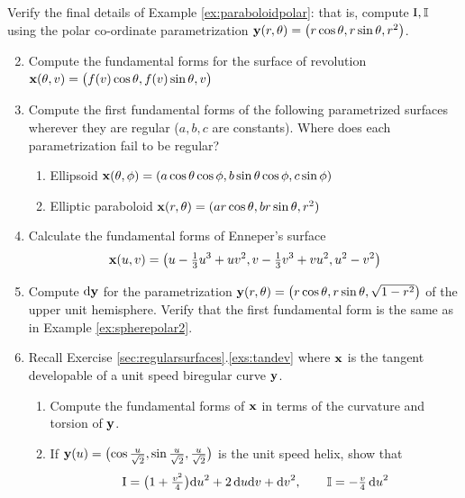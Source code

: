 \begin{exercises}
\exstart Verify the final details of Example \ref{ex:paraboloidpolar}: that is, compute $\mathrm{I},\mathbb{I}$ using the polar co-ordinate parametrization ${\mathbf{y}}(r,\theta)=\bigl(r\cos\theta,r\sin\theta,r^2\big)$.

\begin{enumerate}\setcounter{enumi}{1}  
  \item\label{exs:revfund} Compute the fundamental forms for the surface of revolution ${\mathbf{x}}(\theta,v)=\bigl(f(v)\cos\theta,f(v)\sin\theta,v\bigr)$
  

	\item Compute the first fundamental forms of the following parametrized surfaces wherever they are regular ($a,b,c$ are constants). Where does each parametrization fail to be regular?\vspace{-2pt}
  \begin{enumerate}
    \item Ellipsoid ${\mathbf{x}}(\theta,\phi)=(a\cos\theta\cos\phi,b\sin\theta\cos\phi,c\sin\phi)$
    \item Elliptic paraboloid ${\mathbf{x}}(r,\theta)=(ar\cos\theta,br\sin\theta,r^2)$
  \end{enumerate}
  
  
	\item\label{exs:enneper} Calculate the fundamental forms of Enneper's surface
	\[{\mathbf{x}}(u,v)=\bigl(u-\tfrac 13u^3+uv^2,v-\tfrac 13v^3+vu^2,u^2-v^2\bigr)\]
	
	
	\item Compute $\mathrm{d}{\mathbf{y}}$ for the parametrization ${\mathbf{y}}(r,\theta)=\bigl(r\cos\theta,r\sin\theta,\sqrt{1-r^2}\bigr)$ of the upper unit hemisphere. Verify that the first fundamental form is the same as in Example \ref{ex:spherepolar2}.
	
  
  \item\label{exs:tandevhelix} Recall Exercise \ref*{sec:regularsurfaces}.\ref{exs:tandev} where ${\mathbf{x}}$ is the tangent developable of a unit speed biregular curve ${\mathbf{y}}$.
  \begin{enumerate}
    \item Compute the fundamental forms of ${\mathbf{x}}$ in terms of the curvature and torsion of ${\mathbf{y}}$.
    \item If ${\mathbf{y}}(u)=\bigl(\cos \frac u{\sqrt 2},\sin\frac u{\sqrt 2},\frac u{\sqrt 2}\bigr)$ is the unit speed helix, show that%
  	\[\mathrm{I}=\bigl(1+\tfrac{v^2}{4}\bigr){\mathrm{d} u}^2+2\,{\mathrm{d} u}{\mathrm{d} v}+{\mathrm{d} v}^2,\qquad \mathbb{I}=-\tfrac{v}{4}\,{\mathrm{d} u}^2\]
 	\end{enumerate}
 

\end{enumerate}
\end{exercises}
